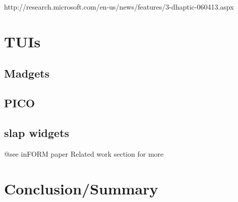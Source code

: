 http://research.microsoft.com/en-us/news/features/3-dhaptic-060413.aspx

\section{TUIs}

\subsection{Madgets}
\subsection{PICO}
\subsection{slap widgets}

@see inFORM paper Related work section for more

\section{Conclusion/Summary}
